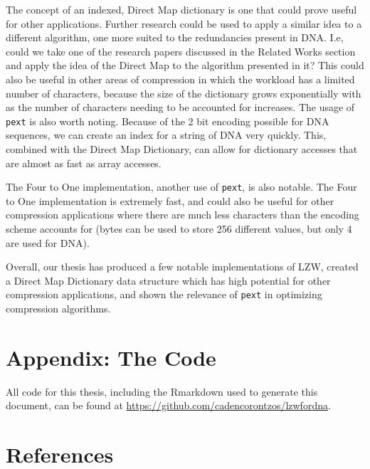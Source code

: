 \documentclass[12pt,twoside]{reedthesis}
\begin{document}
The concept of an indexed, Direct Map dictionary is one that could prove useful for other applications. Further research could be used to apply a similar idea to a different algorithm, one more suited to the redundancies present in DNA. I.e, could we take one of the research papers discussed in the Related Works section and apply the idea of the Direct Map to the algorithm presented in it? This could also be useful in other areas of compression in which the workload has a limited number of characters, because the size of the dictionary grows exponentially with as the number of characters needing to be accounted for increases. The usage of \texttt{pext} is also worth noting. Because of the 2 bit encoding possible for DNA sequences, we can create an index for a string of DNA very quickly. This, combined with the Direct Map Dictionary, can allow for dictionary accesses that are almost as fast as array accesses.

The Four to One implementation, another use of \texttt{pext}, is also notable. The Four to One implementation is extremely fast, and could also be useful for other compression applications where there are much less characters than the encoding scheme accounts for (bytes can be used to store 256 different values, but only 4 are used for DNA).

Overall, our thesis has produced a few notable implementations of LZW, created a Direct Map Dictionary data structure which has high potential for other compression applications, and shown the relevance of \texttt{pext} in optimizing compression algorithms.

\appendix

\hypertarget{appendix-the-code}{%
\chapter{Appendix: The Code}\label{appendix-the-code}}

All code for this thesis, including the Rmarkdown used to generate this document, can be found at \url{https://github.com/cadencorontzos/lzwfordna}.

\backmatter

\hypertarget{references}{%
\chapter*{References}\label{references}}

\end{document}
